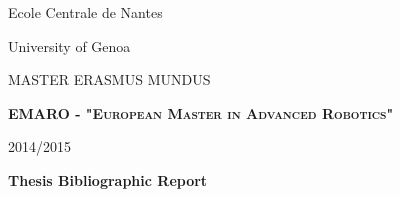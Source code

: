 \documentclass[11pt, openright]{Thesis} %
\begin{document}
\setcounter{tocdepth}{2}
\begin{titlepage}
\singlespacing
     \noindent \begin{minipage}{0.5\textwidth}
	\begin{flushleft} 
	{\large Ecole Centrale de Nantes}
	\end{flushleft}
	\end{minipage}
	\begin{minipage}{0.5\textwidth}
	\begin{flushright}
	{\large University of Genoa}
    \end{flushright}	 
	\end{minipage}
\begin{figure}[H]
\center
\end{figure}
	\begin{center}
	\vspace*{0.2in}
	{\Large MASTER ERASMUS MUNDUS}
	
	\vspace{0.2in}	\textbf{\textsc{EMARO - "European Master in Advanced Robotics"}}
	
	\vspace{0.2in}	
	
	2014/2015
	
	\vspace{0.2in}
	
	\large \textbf{Thesis Bibliographic Report}
	
	\vspace{0.3in}
	

\end{center}
\end{titlepage}
\end{document}
